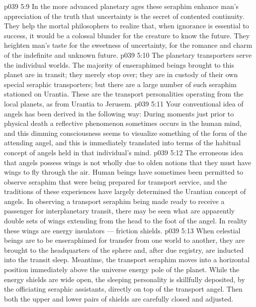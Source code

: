 \vs p039 5:9 In the more advanced planetary ages these seraphim enhance man’s appreciation of the truth that uncertainty is the secret of contented continuity. They help the mortal philosophers to realize that, when ignorance is essential to success, it would be a colossal blunder for the creature to know the future. They heighten man’s taste for the sweetness of uncertainty, for the romance and charm of the indefinite and unknown future.
\vs p039 5:10 \bibnobreakspace {} The planetary transporters serve the individual worlds. The majority of enseraphimed beings brought to this planet are in transit; they merely stop over; they are in custody of their own special seraphic transporters; but there are a large number of such seraphim stationed on Urantia. These are the transport personalities operating from the local planets, as from Urantia to Jerusem.
\vs p039 5:11 \pc Your conventional idea of angels has been derived in the following way: During moments just prior to physical death a reflective phenomenon sometimes occurs in the human mind, and this dimming consciousness seems to visualize something of the form of the attending angel, and this is immediately translated into terms of the habitual concept of angels held in that individual’s mind.
\vs p039 5:12 The erroneous idea that angels possess wings is not wholly due to olden notions that they must have wings to fly through the air. Human beings have sometimes been permitted to observe seraphim that were being prepared for transport service, and the traditions of these experiences have largely determined the Urantian concept of angels. In observing a transport seraphim being made ready to receive a passenger for interplanetary transit, there may be seen what are apparently double sets of wings extending from the head to the foot of the angel. In reality these wings are energy insulators --- friction shields.
\vs p039 5:13 \pc When celestial beings are to be enseraphimed for transfer from one world to another, they are brought to the headquarters of the sphere and, after due registry, are inducted into the transit sleep. Meantime, the transport seraphim moves into a horizontal position immediately above the universe energy pole of the planet. While the energy shields are wide open, the sleeping personality is skillfully deposited, by the officiating seraphic assistants, directly on top of the transport angel. Then both the upper and lower pairs of shields are carefully closed and adjusted.
